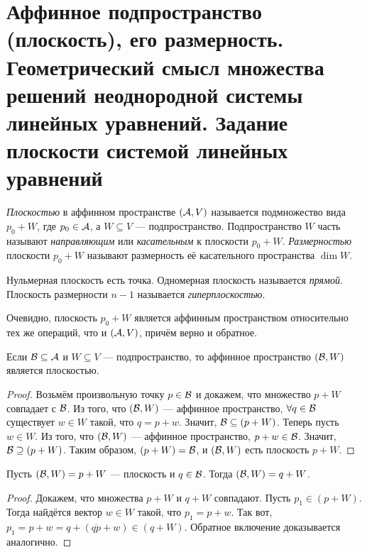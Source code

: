 \section{Аффинное подпространство (плоскость), его размерность. Геометрический смысл множества решений неоднородной системы линейных уравнений. Задание плоскости системой линейных уравнений}

\begin{definition}
    \textit{Плоскостью} в аффинном пространстве $(\mathcal{A}, V)$ называется подмножество вида $p_0 + W$, где $p_0 \in \mathcal{A}$, а $W \subseteq V$ --- подпространство. Подпространство $W$ часть называют \textit{направляющим} или \textit{касательным} к плоскости $p_0 + W$. \textit{Размерностью} плоскости $p_0 + W$ называют размерность её касательного пространства $\dim W$.
\end{definition}

Нульмерная плоскость есть точка. Одномерная плоскость называется \textit{прямой}. Плоскость размерности $n - 1$ называется \textit{гиперплоскостью}.

Очевидно, плоскость $p_0 + W$ является аффинным пространством относительно тех же операций, что и $(\mathcal{A}, V)$, причём верно и обратное.

\begin{proposal}
    Если $\mathcal{B} \subseteq \mathcal{A}$ и $W \subseteq V$ --- подпространство, то аффинное пространство $(\mathcal{B}, W)$ является плоскостью.
\end{proposal}

\begin{proof}
    Возьмём произвольную точку $p \in \mathcal{B}$ и докажем, что множество $p + W$ совпадает с $\mathcal{B}$. Из того, что $(\mathcal{B}, W)$ --- аффинное пространство, $\forall q \in \mathcal{B}$ существует $w \in W$ такой, что $q = p + w$. Значит, $\mathcal{B} \subseteq (p + W)$. Теперь пусть $w \in W$. Из того, что $(\mathcal{B}, W)$ --- аффинное пространство, $p + w \in \mathcal{B}$. Значит, $\mathcal{B} \supseteq (p + W)$. Таким образом, $(p + W) = \mathcal{B}$, и $(\mathcal{B}, W)$ есть плоскость $p + W$.
\end{proof}

\begin{proposal}
    Пусть $(\mathcal{B}, W) = p + W$ --- плоскость и $q \in \mathcal{B}$. Тогда $(\mathcal{B}, W) = q + W$.
\end{proposal}

\begin{proof}
    Докажем, что множества $p + W$ и $q + W$ совпадают. Пусть $p_1 \in (p + W)$. Тогда найдётся вектор $w \in W$ такой, что $p_1 = p + w$. Так вот, $p_1 = p + w = q + (\overline{qp} + w) \in (q + W)$. Обратное включение доказывается аналогично.
\end{proof}


